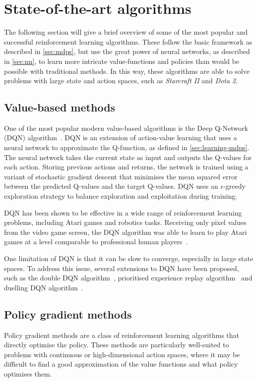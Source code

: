 \section{State-of-the-art algorithms}
\label{sec:rl_algs}
The following section will give a brief overview of some of the most popular and successful reinforcement learning algorithms.
These follow the basic framework as described in \cref{sec:mdps}, but use the great power of neural networks, as described in \cref{sec:nn}, to learn more intricate value-functions and policies than would be possible with traditional methods.
In this way, these algorithms are able to solve problems with large state and action spaces, such as \textit{Starcraft II} and \textit{Dota 2}.

\subsection{Value-based methods}
One of the most popular modern value-based algorithms is the Deep Q-Network (DQN) algorithm~\autocite{mnih2013}.
DQN is an extension of action-value learning that uses a neural network to approximate the Q-function, as defined in \cref{sec:learning-mdps}.
The neural network takes the current state as input and outputs the Q-values for each action.
Storing previous actions and returns, the network is trained using a variant of stochastic gradient descent that minimises the mean squared error between the predicted Q-values and the target Q-values.
DQN uses an $\epsilon$-greedy exploration strategy to balance exploration and exploitation during training.

DQN has been shown to be effective in a wide range of reinforcement learning problems, including Atari games and robotics tasks.
Receiving only pixel values from the video game screen, the DQN algorithm was able to learn to play Atari games at a level comparable to professional human players~\autocite{mnih2015}.

One limitation of DQN is that it can be slow to converge, especially in large state spaces.
To address this issue, several extensions to DQN have been proposed, such as the double DQN algorithm~\autocite{hasselt2016}, prioritised experience replay algorithm~\autocite{schaul2015} and duelling DQN algorithm~\autocite{wang2016}.

\subsection{Policy gradient methods}
Policy gradient methods are a class of reinforcement learning algorithms that directly optimise the policy.
These methods are particularly well-suited to problems with continuous or high-dimensional action spaces, where it may be difficult to find a good approximation of the value functions and what policy optimises them.

